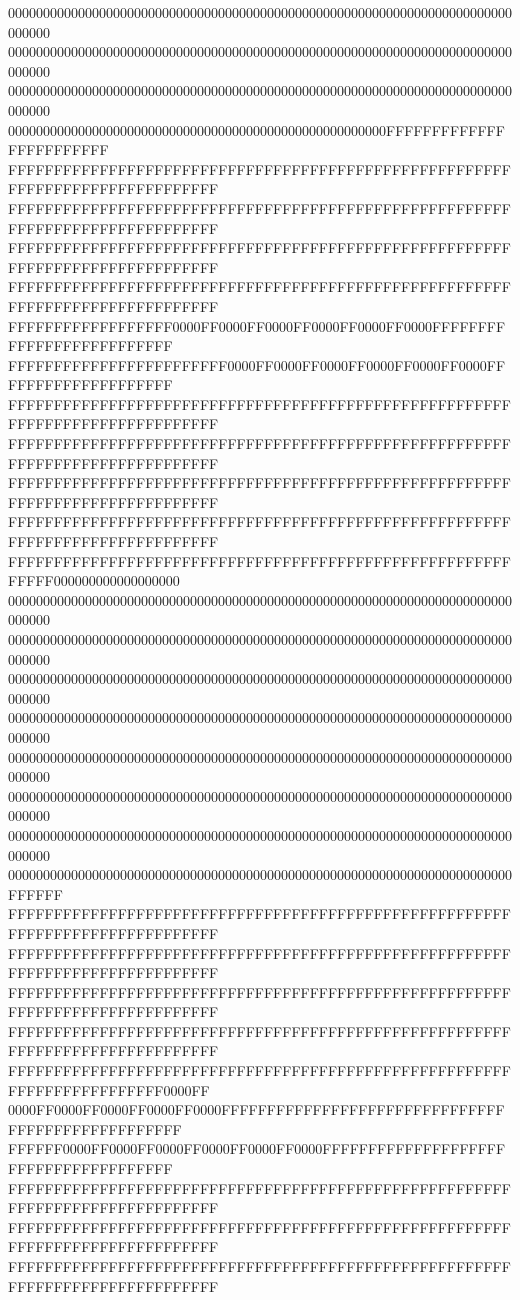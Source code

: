 000000000000000000000000000000000000000000000000000000000000000000000000000000
000000000000000000000000000000000000000000000000000000000000000000000000000000
000000000000000000000000000000000000000000000000000000000000000000000000000000
000000000000000000000000000000000000000000000000000000FFFFFFFFFFFFFFFFFFFFFFFF
FFFFFFFFFFFFFFFFFFFFFFFFFFFFFFFFFFFFFFFFFFFFFFFFFFFFFFFFFFFFFFFFFFFFFFFFFFFFFF
FFFFFFFFFFFFFFFFFFFFFFFFFFFFFFFFFFFFFFFFFFFFFFFFFFFFFFFFFFFFFFFFFFFFFFFFFFFFFF
FFFFFFFFFFFFFFFFFFFFFFFFFFFFFFFFFFFFFFFFFFFFFFFFFFFFFFFFFFFFFFFFFFFFFFFFFFFFFF
FFFFFFFFFFFFFFFFFFFFFFFFFFFFFFFFFFFFFFFFFFFFFFFFFFFFFFFFFFFFFFFFFFFFFFFFFFFFFF
FFFFFFFFFFFFFFFFFF0000FF0000FF0000FF0000FF0000FF0000FFFFFFFFFFFFFFFFFFFFFFFFFF
FFFFFFFFFFFFFFFFFFFFFFFF0000FF0000FF0000FF0000FF0000FF0000FFFFFFFFFFFFFFFFFFFF
FFFFFFFFFFFFFFFFFFFFFFFFFFFFFFFFFFFFFFFFFFFFFFFFFFFFFFFFFFFFFFFFFFFFFFFFFFFFFF
FFFFFFFFFFFFFFFFFFFFFFFFFFFFFFFFFFFFFFFFFFFFFFFFFFFFFFFFFFFFFFFFFFFFFFFFFFFFFF
FFFFFFFFFFFFFFFFFFFFFFFFFFFFFFFFFFFFFFFFFFFFFFFFFFFFFFFFFFFFFFFFFFFFFFFFFFFFFF
FFFFFFFFFFFFFFFFFFFFFFFFFFFFFFFFFFFFFFFFFFFFFFFFFFFFFFFFFFFFFFFFFFFFFFFFFFFFFF
FFFFFFFFFFFFFFFFFFFFFFFFFFFFFFFFFFFFFFFFFFFFFFFFFFFFFFFFFFFF000000000000000000
000000000000000000000000000000000000000000000000000000000000000000000000000000
000000000000000000000000000000000000000000000000000000000000000000000000000000
000000000000000000000000000000000000000000000000000000000000000000000000000000
000000000000000000000000000000000000000000000000000000000000000000000000000000
000000000000000000000000000000000000000000000000000000000000000000000000000000
000000000000000000000000000000000000000000000000000000000000000000000000000000
000000000000000000000000000000000000000000000000000000000000000000000000000000
000000000000000000000000000000000000000000000000000000000000000000000000FFFFFF
FFFFFFFFFFFFFFFFFFFFFFFFFFFFFFFFFFFFFFFFFFFFFFFFFFFFFFFFFFFFFFFFFFFFFFFFFFFFFF
FFFFFFFFFFFFFFFFFFFFFFFFFFFFFFFFFFFFFFFFFFFFFFFFFFFFFFFFFFFFFFFFFFFFFFFFFFFFFF
FFFFFFFFFFFFFFFFFFFFFFFFFFFFFFFFFFFFFFFFFFFFFFFFFFFFFFFFFFFFFFFFFFFFFFFFFFFFFF
FFFFFFFFFFFFFFFFFFFFFFFFFFFFFFFFFFFFFFFFFFFFFFFFFFFFFFFFFFFFFFFFFFFFFFFFFFFFFF
FFFFFFFFFFFFFFFFFFFFFFFFFFFFFFFFFFFFFFFFFFFFFFFFFFFFFFFFFFFFFFFFFFFFFFFF0000FF
0000FF0000FF0000FF0000FF0000FFFFFFFFFFFFFFFFFFFFFFFFFFFFFFFFFFFFFFFFFFFFFFFFFF
FFFFFF0000FF0000FF0000FF0000FF0000FF0000FFFFFFFFFFFFFFFFFFFFFFFFFFFFFFFFFFFFFF
FFFFFFFFFFFFFFFFFFFFFFFFFFFFFFFFFFFFFFFFFFFFFFFFFFFFFFFFFFFFFFFFFFFFFFFFFFFFFF
FFFFFFFFFFFFFFFFFFFFFFFFFFFFFFFFFFFFFFFFFFFFFFFFFFFFFFFFFFFFFFFFFFFFFFFFFFFFFF
FFFFFFFFFFFFFFFFFFFFFFFFFFFFFFFFFFFFFFFFFFFFFFFFFFFFFFFFFFFFFFFFFFFFFFFFFFFFFF

